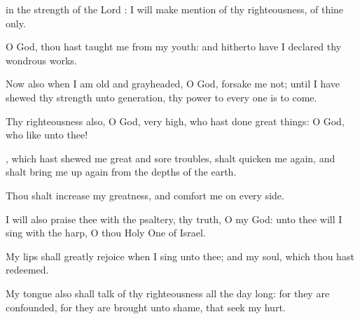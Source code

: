 {in the
strength of the
Lord
{}: I will make
mention of thy
righteousness,
{} of thine only.
\par }{\Q {}O
God, thou hast
taught me from my
youth: and hitherto have I
declared thy wondrous
works.
\par }{\Q {}Now also
when I am
old and
grayheaded, O
God,
forsake me not; until I have
shewed thy
strength unto
{}
generation,
{} thy
power to every one
{} is to
come.
\par }{\Q {}Thy
righteousness also, O
God,
{} very
high, who hast
done great
things: O
God, who
{} like unto thee!
\par }{\Q {}, which hast
shewed me
great and
sore
troubles, shalt
quicken me
again, and shalt bring me
up
again from the
depths of the
earth.
\par }{\Q {}Thou shalt
increase my
greatness, and
comfort me on every
side.
\par }{\Q {}I will also
praise thee with the
psaltery,
{} thy
truth, O my
God: unto thee will I
sing with the
harp, O thou Holy
One of
Israel.
\par }{\Q {}My
lips shall greatly
rejoice when I
sing unto thee; and my
soul, which thou hast
redeemed.
\par }{\Q {}My
tongue also shall
talk of thy
righteousness all the
day long: for they are
confounded, for they are brought unto
shame, that
seek my
hurt.

}

